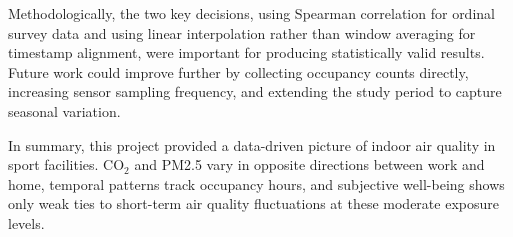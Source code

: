 \documentclass[12pt,a4paper]{article}
\begin{document}
Methodologically, the two key decisions, using Spearman correlation for ordinal survey data and using linear interpolation rather than window averaging for timestamp alignment, were important for producing statistically valid results. Future work could improve further by collecting occupancy counts directly, increasing sensor sampling frequency, and extending the study period to capture seasonal variation.

In summary, this project provided a data-driven picture of indoor air quality in sport facilities. CO$_2$ and PM2.5 vary in opposite directions between work and home, temporal patterns track occupancy hours, and subjective well-being shows only weak ties to short-term air quality fluctuations at these moderate exposure levels.
\end{document}
